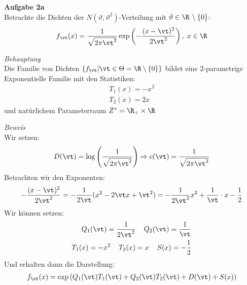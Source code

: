 \documentclass[12pt]{article}
\begin{document}
 \begin{description}
                \item{\textbf{Aufgabe 2a}\\
                Betrachte die Dichten der $N(\vartheta,\vartheta^2)$-Verteilung mit $\vartheta\in\R\,\setminus \{0\}$:
                \begin{align*}
                    f_{\vt}(x)=\frac{1}{\sqrt{2\pi\vt^2}}\exp\left(-\frac{(x-\vt)^2}{2\vt^2}\right) , \hspace{1mm} x\in\R
                \end{align*}
                }   
                \item{\textit{Behauptung}\\
                Die Familie von Dichten $\{f_{\vt}|\vt\in\Theta=\R\setminus\{0\}\}$ bildet eine $2$-parametrige Exponentielle Familie mit den Statistiken:
                \begin{align*}
                    T_1(x)=-x^2 \\
                    T_2(x)=2x 
                \end{align*}
                und natürlichem Parameterraum $Z^*=\R_{+}\times\R$
                }
                \item{\textit{Beweis}\\
            Wir setzen:
            \begin{align*}
                D(\vt)=\log\left(\frac{1}{\sqrt{2\pi\vt^2}}\right) \Rightarrow c(\vt)=\frac{1}{\sqrt{2\pi\vt^2}}
            \end{align*}
                Betrachten wir den Exponenten:
                \begin{align*}
                    -\frac{(x-\vt)^2}{2\vt^2}=-\frac{1}{2\vt}(x^2-2\vt x +\vt^2)=-\frac{1}{2\vt^2}x^2+\frac{1}{\vt}\cdot x-\frac{1}{2}
                \end{align*}
                Wir können setzen:
                \begin{align*}
                    Q_1(\vt)=\frac{1}{2\vt^2}  \hspace{4mm} Q_2(\vt)=\frac{1}{\vt} \\
                    T_1(x)=-x^2  \hspace{4mm} T_2(x)=x  \hspace{4mm} S(x)=-\frac{1}{2}
                \end{align*}
                Und erhalten dann die Darstellung:
                \begin{align*}
                    f_{\vt}(x)=\exp\left(Q_1(\vt)T_1(\vt)+Q_2(\vt)T_2(\vt)+D(\vt)+S(x)\right) \\

\end{align*}}
\end{description}
\end{document}
